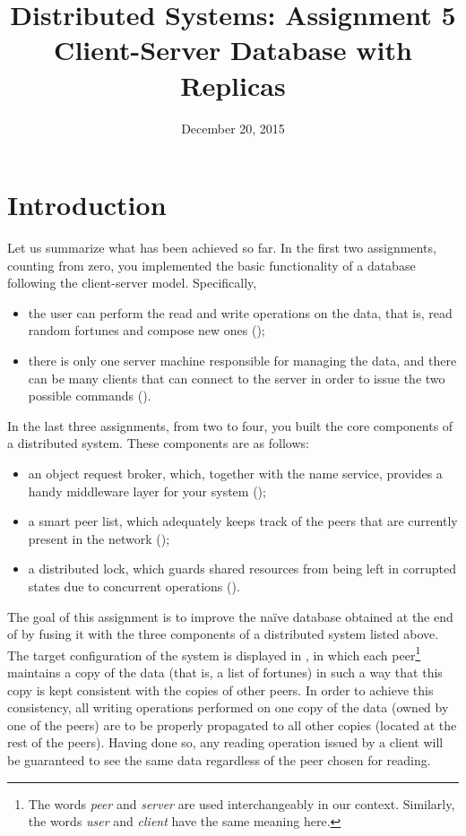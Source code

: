 \documentclass[a4paper]{article}
\title{Distributed Systems: Assignment 5\\Client-Server Database with Replicas}
\author{}
\date{December 20, 2015}
\begin{document}
\maketitle

\section{Introduction}

Let us summarize what has been achieved so far. In the first two assignments,
counting from zero, you implemented the basic functionality of a database
following the client-server model. Specifically,
\begin{itemize}

  \item the user can perform the read and write operations on the data, that is,
  read random fortunes and compose new ones ();

  \item there is only one server machine responsible for managing the data, and
  there can be many clients that can connect to the server in order to issue the
  two possible commands ().

\end{itemize}
In the last three assignments, from two to four, you built the core components
of a distributed system. These components are as follows:
\begin{itemize}

  \item an object request broker, which, together with the name service,
  provides a handy middleware layer for your system ();

  \item a smart peer list, which adequately keeps track of the peers that are
  currently present in the network ();

  \item a distributed lock, which guards shared resources from being left in
  corrupted states due to concurrent operations ().

\end{itemize}
The goal of this assignment is to improve the na\"{i}ve database obtained at the
end of  by fusing it with the three components of a distributed system
listed above. The target configuration of the system is displayed in
, in which each peer\footnote{The words \emph{peer}
and \emph{server} are used interchangeably in our context. Similarly, the words
\emph{user} and \emph{client} have the same meaning here.} maintains a copy of
the data (that is, a list of fortunes) in such a way that this copy is kept
consistent with the copies of other peers. In order to achieve this consistency,
all writing operations performed on one copy of the data (owned by one of the
peers) are to be properly propagated to all other copies (located at the rest of
the peers). Having done so, any reading operation issued by a client will be
guaranteed to see the same data regardless of the peer chosen for reading.
\end{document}
